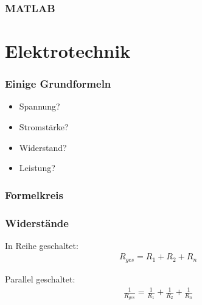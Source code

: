 \documentclass[german,ignorenonframetext]{beamer} %
\begin{document}
\begin{frame}
\frametitle{MATLAB}
\end{frame} 

\section{Elektrotechnik}
\begin{frame}
\frametitle{Einige Grundformeln}
\begin{itemize}
\item Spannung?
\item Stromstärke?
\item Widerstand?
\item Leistung?
\end{itemize}
\end{frame} 

\begin{frame}
\frametitle{Formelkreis}
\begin{center}
\end{center}
\end{frame} 

\begin{frame}
\frametitle{Widerstände}
In Reihe geschaltet:
\begin{eqnarray}
R_{ges} = R_{1} + R_{2} + R_{n}
\end{eqnarray}

Parallel geschaltet:
\begin{eqnarray}
\frac{1}{R_{ges}} = \frac{1}{R_{1}} + \frac{1}{R_{2}} + \frac{1}{R_{n}}
\end{eqnarray}
\end{frame}
\end{document}
